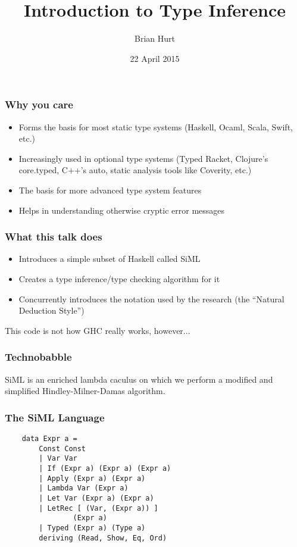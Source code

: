 \documentclass{beamer}
\title{Introduction to Type Inference}
\author{Brian Hurt}
\date{22 April 2015}
\begin{document}
\begin{frame}
    \titlepage
\end{frame}


\begin{frame}
\frametitle{Why you care}
\begin{itemize}
\item Forms the basis for most static type systems (Haskell, Ocaml, Scala, Swift, etc.)
\item Increasingly used in optional type systems (Typed Racket, Clojure's
core.typed, C++'s auto, static analysis tools like Coverity, etc.)
\item The basis for more advanced type system features
\item Helps in understanding otherwise cryptic error messages
\end{itemize}

\end{frame}

\begin{frame}
\frametitle{What this talk does}
\begin{itemize}
\item Introduces a simple subset of Haskell called SiML
\item Creates a type inference/type checking algorithm for it
\item Concurrently introduces the notation used by the research (the
``Natural Deduction Style'')
\end{itemize}

This code is not how GHC really works, however...
\end{frame}

\begin{frame}
\frametitle{Technobabble}
\begin{center}
SiML is an enriched lambda caculus on which we perform a modified and
simplified Hindley-Milner-Damas algorithm.
\end{center}
\end{frame}

\begin{frame}[fragile]
\frametitle{The SiML Language}
{\tt \Large{
\begin{verbatim}
    data Expr a =
        Const Const
        | Var Var
        | If (Expr a) (Expr a) (Expr a)
        | Apply (Expr a) (Expr a)
        | Lambda Var (Expr a)
        | Let Var (Expr a) (Expr a)
        | LetRec [ (Var, (Expr a)) ]
                (Expr a)
        | Typed (Expr a) (Type a)
        deriving (Read, Show, Eq, Ord)
\end{verbatim}
}}
\end{frame}
\end{document}
